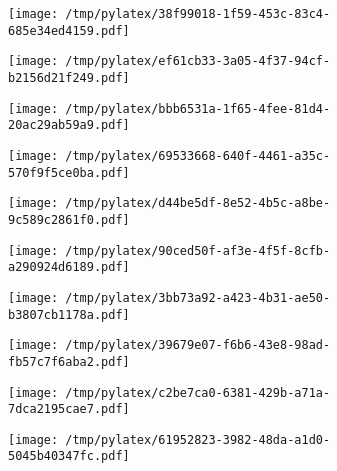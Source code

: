 \documentclass{article}
\begin{document}
\begin{figure}[htbp]
\begin{subfigure}[b]{.3\linewidth}
\texttt{[image: /tmp/pylatex/38f99018-1f59-453c-83c4-685e34ed4159.pdf]}
\end{subfigure}
\begin{subfigure}[b]{.3\linewidth}
\texttt{[image: /tmp/pylatex/ef61cb33-3a05-4f37-94cf-b2156d21f249.pdf]}
\end{subfigure}
\begin{subfigure}[b]{.3\linewidth}
\texttt{[image: /tmp/pylatex/bbb6531a-1f65-4fee-81d4-20ac29ab59a9.pdf]}
\end{subfigure}
\begin{subfigure}[b]{.3\linewidth}
\texttt{[image: /tmp/pylatex/69533668-640f-4461-a35c-570f9f5ce0ba.pdf]}
\end{subfigure}
\begin{subfigure}[b]{.3\linewidth}
\texttt{[image: /tmp/pylatex/d44be5df-8e52-4b5c-a8be-9c589c2861f0.pdf]}
\end{subfigure}
\begin{subfigure}[b]{.3\linewidth}
\texttt{[image: /tmp/pylatex/90ced50f-af3e-4f5f-8cfb-a290924d6189.pdf]}
\end{subfigure}
\begin{subfigure}[b]{.3\linewidth}
\texttt{[image: /tmp/pylatex/3bb73a92-a423-4b31-ae50-b3807cb1178a.pdf]}
\end{subfigure}
\begin{subfigure}[b]{.3\linewidth}
\texttt{[image: /tmp/pylatex/39679e07-f6b6-43e8-98ad-fb57c7f6aba2.pdf]}
\end{subfigure}
\begin{subfigure}[b]{.3\linewidth}
\texttt{[image: /tmp/pylatex/c2be7ca0-6381-429b-a71a-7dca2195cae7.pdf]}
\end{subfigure}
\begin{subfigure}[b]{.3\linewidth}
\texttt{[image: /tmp/pylatex/61952823-3982-48da-a1d0-5045b40347fc.pdf]}
\end{subfigure}
\end{figure}
\end{document}
